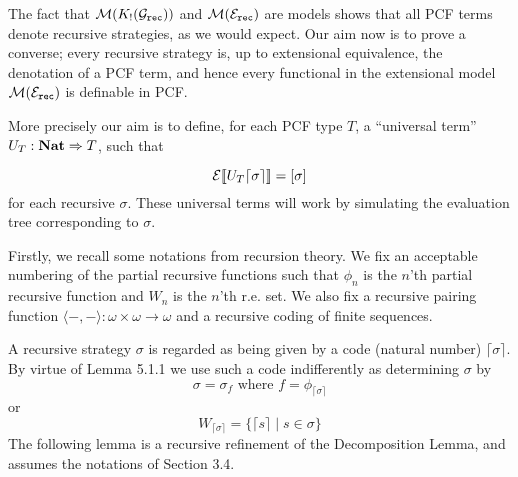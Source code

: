 \documentclass[11pt]{article}
\newcommand{\E}{{\cal E}}
\newcommand{\G}{{\cal G}}
\newcommand{\M}{{\cal M}}
\newcommand{\Nat}{{\bf Nat}}
\newcommand{\lang}{\langle}
\newcommand{\rang}{\rangle}
\begin{document}
The fact that $\M(K_{!}(\G_{\tt rec}))$ and $\M(\E_{\tt rec})$ are models
shows that all PCF terms denote recursive strategies, as we would expect.
Our aim now is to prove a converse; every recursive strategy is, up to
extensional equivalence, the denotation of a PCF term, and hence every
functional in the extensional model $\M(\E_{\tt rec})$ is definable in PCF.

More precisely our aim is to define, for each PCF type $T$, a
``universal term'' $U_T:\Nat \Rightarrow T$, such that

$$\E\llbracket U_T \lceil\sigma\rceil\rrbracket = [\sigma]$$
for each recursive $\sigma$. These universal terms will
work by simulating the evaluation tree corresponding to $\sigma$.

Firstly, we recall some notations from recursion theory. We fix an acceptable
numbering of the partial recursive functions \cite{SoareRI:recesd}
such that $\phi_n$ is the $n$'th
partial recursive function and $W_n$ is the $n$'th r.e. set. We also fix
a recursive pairing function
$\lang -,-\rang :\omega\times\omega\rightarrow\omega$
and a recursive coding of finite sequences.

A recursive strategy $\sigma$ is regarded as being given by a code
(natural number) $\lceil \sigma\rceil$. By virtue of Lemma 5.1.1
we use such a code indifferently as determining $\sigma$ by
$$\sigma=\sigma_f \mbox{ where } f=\phi_{\lceil\sigma\rceil}$$ or
$$W_{\lceil\sigma\rceil}=\{\lceil s\rceil \mid s\in\sigma\}$$ The
following lemma is a recursive refinement of the Decomposition
Lemma, and assumes the notations of Section 3.4.


\newcommand{\casodue}[5] { \[ {#1} = \left\{  \begin{array}{ll}
                         {#2} & {{#3}} \\
                         {#4} & {{#5}}
                         \end{array}
                      \right. \] }

\newcommand{\casotre}[7] { \[ {#1} = \left\{  \begin{array}{ll}
                         {#2} & {{#3}} \\
                         {#4} & {{#5}} \\
                         {#6} & {{#7}}
                         \end{array}
                      \right. \] }
\end{document}
